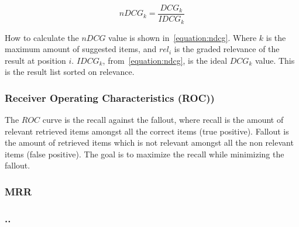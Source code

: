 \begin{equation}
	nDCG_k = \frac{DCG_k}{IDCG_k}
	\label{equation:ndcg}
\end{equation}

How to calculate the $nDCG$ value is shown in~\ref{equation:ndcg}.
Where $k$ is the maximum amount of suggested items, and $rel_i$ is the graded relevance of the result at position $i$.
$IDCG_k$, from~\ref{equation:ndcg}, is the ideal $DCG_k$ value.
This is the result list sorted on relevance.



\subsubsection{Receiver Operating Characteristics (ROC))}
The $ROC$ curve is the recall against the fallout, where recall is the amount of relevant retrieved items amongst all the correct items (true positive).
Fallout is the amount of retrieved items which is not relevant amongst all the non relevant items (false positive).
The goal is to maximize the recall while minimizing the fallout.


\subsubsection{MRR}
\subsubsection{..}

